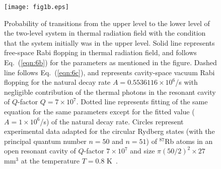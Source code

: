 \documentclass[aps,pra,twocolumn,showpacs,preprintnumbers,amsmath,amssymb,footinbib]{revtex4}
\begin{document}
\begin{figure}
\texttt{[image: fig1b.eps]}
\caption{
Probability of transitions from the upper level to the lower level of the two-level system in thermal radiation field with the condition that the system initially was in the upper level. Solid line represents free-space Rabi flopping in thermal radiation field, and follows Eq.~(\ref{eqn:6b}) for the parameters as mentioned in the figure. Dashed line follows Eq.~(\ref{eqn:6c}), and represents cavity-space vacuum Rabi flopping  for the natural decay rate $A=0.5536116\times10^6$/s with negligible contribution of the thermal photons in the resonant cavity of $Q$-factor $Q=7\times10^7$. Dotted line represents fitting of the same equation for the same parameters except for the fitted value ($A=1\times10^6$/s) of the natural decay rate. Circles represent experimental data adapted for the circular Rydberg states (with the principal quantum number $n=50$ and $n=51$) of $^{87}$Rb atoms in an open resonant cavity of $Q$-factor $7\times10^7$ and size $\pi(50/2)^2\times27$ mm$^3$ at the temperature $T=0.8$ K~\cite{Brune}.
\label{fig1b}}
\end{figure}
\end{document}
